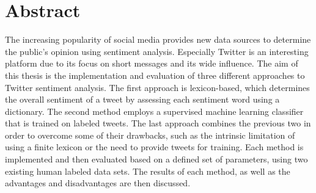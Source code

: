 \chapter*{Abstract}

\iffalse

\selectlanguage{english}
Questions:
\begin{itemize}
\item How much explanation of the methods? --> nicht so viel, so wie ich es gemacht habe
\item Should extraction of tweets be part of the abstract?
\item Should the results be part of the abstract? --> rauslassen, eher Motivation --> contributions Werbung nicht Kurzzusammenfassung,Ziele
\item Motivation/introduction?
Ziele: Was genau soll ermittelt werden, was machen mit diesen Ergebnissen --> results can be used to implement means of evaluating --> Praxisbezug, ein Satz reicht
\end{itemize}
\fi

The increasing popularity of social media provides new data sources to determine the public's opinion using sentiment analysis. Especially Twitter is an interesting platform due to its focus on short messages and its wide influence. The aim of this thesis is the implementation and evaluation of three different approaches to Twitter sentiment analysis. The first approach is lexicon-based, which determines the overall sentiment of a tweet by assessing each sentiment word using a dictionary. The second method employs a supervised machine learning classifier that is trained on labeled tweets. The last approach combines the previous two in order to overcome some of their drawbacks, such as the intrinsic limitation of using a finite lexicon or the need to provide tweets for training. Each method is implemented and then evaluated based on a defined set of parameters, using two existing human labeled data sets. The results of each method, as well as the advantages and disadvantages are then discussed.


